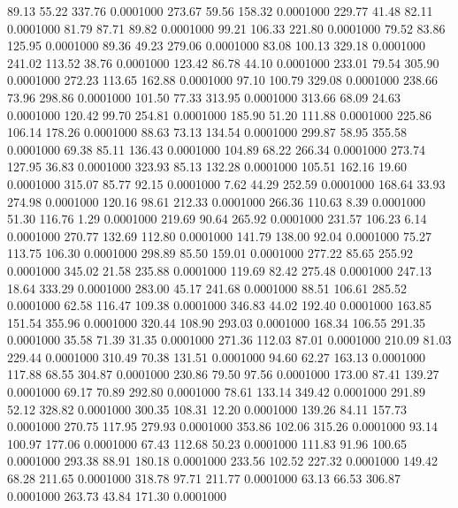   89.13   55.22  337.76   0.0001000
 273.67   59.56  158.32   0.0001000
 229.77   41.48   82.11   0.0001000
  81.79   87.71   89.82   0.0001000
  99.21  106.33  221.80   0.0001000
  79.52   83.86  125.95   0.0001000
  89.36   49.23  279.06   0.0001000
  83.08  100.13  329.18   0.0001000
 241.02  113.52   38.76   0.0001000
 123.42   86.78   44.10   0.0001000
 233.01   79.54  305.90   0.0001000
 272.23  113.65  162.88   0.0001000
  97.10  100.79  329.08   0.0001000
 238.66   73.96  298.86   0.0001000
 101.50   77.33  313.95   0.0001000
 313.66   68.09   24.63   0.0001000
 120.42   99.70  254.81   0.0001000
 185.90   51.20  111.88   0.0001000
 225.86  106.14  178.26   0.0001000
  88.63   73.13  134.54   0.0001000
 299.87   58.95  355.58   0.0001000
  69.38   85.11  136.43   0.0001000
 104.89   68.22  266.34   0.0001000
 273.74  127.95   36.83   0.0001000
 323.93   85.13  132.28   0.0001000
 105.51  162.16   19.60   0.0001000
 315.07   85.77   92.15   0.0001000
   7.62   44.29  252.59   0.0001000
 168.64   33.93  274.98   0.0001000
 120.16   98.61  212.33   0.0001000
 266.36  110.63    8.39   0.0001000
  51.30  116.76    1.29   0.0001000
 219.69   90.64  265.92   0.0001000
 231.57  106.23    6.14   0.0001000
 270.77  132.69  112.80   0.0001000
 141.79  138.00   92.04   0.0001000
  75.27  113.75  106.30   0.0001000
 298.89   85.50  159.01   0.0001000
 277.22   85.65  255.92   0.0001000
 345.02   21.58  235.88   0.0001000
 119.69   82.42  275.48   0.0001000
 247.13   18.64  333.29   0.0001000
 283.00   45.17  241.68   0.0001000
  88.51  106.61  285.52   0.0001000
  62.58  116.47  109.38   0.0001000
 346.83   44.02  192.40   0.0001000
 163.85  151.54  355.96   0.0001000
 320.44  108.90  293.03   0.0001000
 168.34  106.55  291.35   0.0001000
  35.58   71.39   31.35   0.0001000
 271.36  112.03   87.01   0.0001000
 210.09   81.03  229.44   0.0001000
 310.49   70.38  131.51   0.0001000
  94.60   62.27  163.13   0.0001000
 117.88   68.55  304.87   0.0001000
 230.86   79.50   97.56   0.0001000
 173.00   87.41  139.27   0.0001000
  69.17   70.89  292.80   0.0001000
  78.61  133.14  349.42   0.0001000
 291.89   52.12  328.82   0.0001000
 300.35  108.31   12.20   0.0001000
 139.26   84.11  157.73   0.0001000
 270.75  117.95  279.93   0.0001000
 353.86  102.06  315.26   0.0001000
  93.14  100.97  177.06   0.0001000
  67.43  112.68   50.23   0.0001000
 111.83   91.96  100.65   0.0001000
 293.38   88.91  180.18   0.0001000
 233.56  102.52  227.32   0.0001000
 149.42   68.28  211.65   0.0001000
 318.78   97.71  211.77   0.0001000
  63.13   66.53  306.87   0.0001000
 263.73   43.84  171.30   0.0001000
